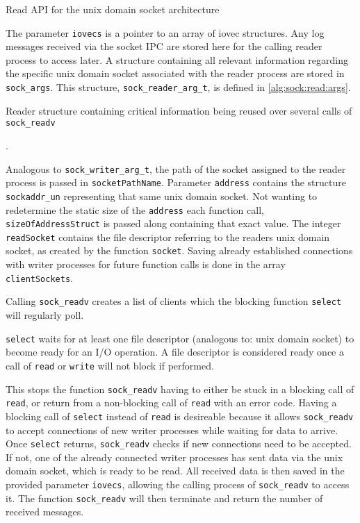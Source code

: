 \begin{algorithm}[h!]
    
    \caption[Socket: Read \ac{API}]{Read \ac{API} for the unix domain socket architecture}
    \label{alg:sock:read}
\end{algorithm}

The parameter \texttt{iovecs} is a pointer to an array of iovec structures.
Any log messages received via the socket \ac{IPC} are stored here for the calling reader process to access later.
A structure containing all relevant information regarding the specific unix domain socket associated with the reader process are stored in \texttt{sock\_args}.
This structure, \texttt{sock\_reader\_arg\_t}, is defined in \ref{alg:sock:read:args}.

\begin{algorithm}[h!]
    
    \caption[Socket: Reader structure]{Reader structure containing critical information being reused over several calls of \texttt{sock\_readv}}.
    \label{alg:sock:read:args}
\end{algorithm}

Analogous to \texttt{sock\_writer\_arg\_t}, the path of the socket assigned to the reader process is passed in \texttt{socketPathName}.
Parameter \texttt{address} contains the structure \texttt{sockaddr\_un} representing that same unix domain socket.
Not wanting to redetermine the static size of the \texttt{address} each function call, \texttt{sizeOfAddressStruct} is passed along containing that exact value.
The integer \texttt{readSocket} contains the file descriptor referring to the readers unix domain socket, as created by the function \texttt{socket}.
Saving already established connections with writer processes for future function calls is done in the array \texttt{clientSockets}.

Calling \texttt{sock\_readv} creates a list of clients which the blocking function \texttt{select} will regularly poll.

\texttt{select} waits for at least one file descriptor (analogous to: unix domain socket) to become ready for an I/O operation.
A file descriptor is considered ready once a call of \texttt{read} or \texttt{write} will not block if performed.\cite{man:select}

This stops the function \texttt{sock\_readv} having to either be stuck in a blocking call of \texttt{read}, or return from a non-blocking call of \texttt{read} with an error code.
Having a blocking call of \texttt{select} instead of \texttt{read} is desireable because it allows \texttt{sock\_readv} to accept connections of new writer processes while waiting for data to arrive.
Once \texttt{select} returns, \texttt{sock\_readv} checks if new connections need to be accepted.
If not, one of the already connected writer processes has sent data via the unix domain socket, which is ready to be read.
All received data is then saved in the provided parameter \texttt{iovecs}, allowing the calling process of \texttt{sock\_readv} to access it.
The function \texttt{sock\_readv} will then terminate and return the number of received messages.
